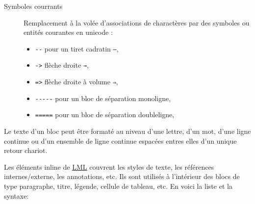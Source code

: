 \documentclass[a4paper,12pt]{article}
\begin{document}
\begin{description}
\item[{Symboles courrants}] Remplacement à la volée d'associations de charactères par des symboles ou entités courantes en unicode :
\begin{itemize}
\item \texttt{-{}-{}} pour un tiret cadratin \texttt{—},
\item \texttt{->} flèche droite \texttt{→},
\item \texttt{=>} flèche droite à volume \texttt{⇒},
\item \texttt{-{}-{}-{}-{}-} pour un bloc de séparation monoligne,
\item \texttt{=====} pour un bloc de séparation doubleligne,
\end{itemize}
\end{description}

Le texte d'un bloc peut être formaté au niveau d'une lettre, d'un mot, d'une ligne continue ou d'un ensemble de ligne continue espacées entres elles d'un unique retour chariot.

Les éléments inline de \protect\hyperlink{gls-2}{\label{gls-2-use-10}LML} couvrent les styles de texte, les références internes/externe, les annotations, etc. Ils sont utilisés à l’intérieur des blocs de type paragraphe, titre, légende, cellule de tableau, etc. En voici la liste et la syntaxe:
\end{document}
